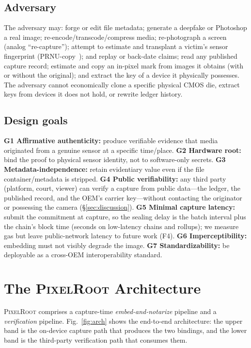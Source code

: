 \documentclass[journal]{IEEEtran}
\newcommand{\pr}{\textup{\textsc{PixelRoot}}}
\begin{document}
\subsection{Adversary}
The adversary may: forge or edit file metadata; generate a deepfake or
Photoshop a real image; re-encode/transcode/compress media; re-photograph a
screen (analog ``re-capture''); attempt to estimate and transplant a victim's
sensor fingerprint (PRNU-copy~\cite{goljan2011defending}); and replay or
back-date claims; read any published capture record; estimate and copy an
in-pixel mark from images it obtains (with or without the original); and
extract the key of a device it physically possesses. The adversary cannot
economically clone a specific physical CMOS die, extract keys from devices it
does not hold, or rewrite ledger history.

\subsection{Design goals}
\textbf{G1 Affirmative authenticity:} produce verifiable evidence that media
originated from a genuine sensor at a specific time/place.
\textbf{G2 Hardware root:} bind the proof to physical sensor identity, not to
software-only secrets.
\textbf{G3 Metadata-independence:} retain evidentiary value even if the file
container/metadata is stripped.
\textbf{G4 Public verifiability:} any third party (platform, court, viewer) can
verify a capture from public data---the ledger, the published record, and the
OEM's carrier key---without contacting the originator or possessing the camera
(\S\ref{sec:discussion}).
\textbf{G5 Minimal capture latency:} submit the commitment at capture, so the
sealing delay is the batch interval plus the chain's block time (seconds on
low-latency chains and rollups); we measure gas but leave public-network latency
to future work (F4).
\textbf{G6 Imperceptibility:} embedding must not visibly degrade the image.
\textbf{G7 Standardizability:} be deployable as a cross-OEM interoperability
standard.

\section{The \pr{} Architecture}\label{sec:arch}

\pr{} comprises a capture-time \emph{embed-and-notarize} pipeline and a
\emph{verification} pipeline. Fig.~\ref{fig:arch} shows the end-to-end
architecture: the upper band is the on-device capture path that produces the
two bindings, and the lower band is the third-party verification path that
consumes them.
\end{document}

